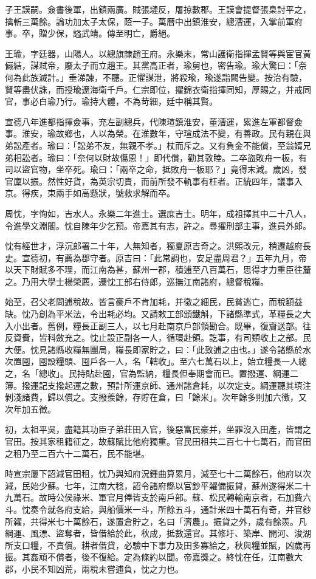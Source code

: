 \begin{pinyinscope}
子王謨嗣。僉書後軍，出鎮兩廣。賊張璉反，屠掠數郡。王謨會提督張臬討平之，擒斬三萬餘。論功加太子太保，蔭一子。萬曆中出鎮淮安，總漕運，入掌前軍府事。卒，贈少保，謚武靖。傳至明亡，爵絕。

王瑜，字廷器，山陽人。以總旗隸趙王府。永樂末，常山護衛指揮孟賢等與宦官黃儼結，謀弒帝，廢太子而立趙王。其黨高正者，瑜舅也，密告瑜。瑜大驚曰：「奈何為此族滅計。」垂涕諫，不聽。正懼謀泄，將殺瑜，瑜遂詣闕告變。按治有驗，賢等盡伏誅，而授瑜遼海衛千戶。仁宗即位，擢錦衣衛指揮同知，厚賜之，并戒同官，事必白瑜乃行。瑜持大體，不為苛細，廷中稱其賢。

宣德八年進都指揮僉事，充左副總兵，代陳瑄鎮淮安，董漕運，累進左軍都督僉事。淮安，瑜故鄉也，人以為榮。在淮數年，守瑄成法不變，有善政。民有親在與弟訟產者。瑜曰：「訟弟不友，無親不孝。」杖而斥之。又有負金不能償，至翁婿兄弟相訟者。瑜曰：「奈何以財故傷恩！」即代償，勸其敦睦。二卒盜敗舟一板，有司以盜官物，坐卒死。瑜曰：「兩卒之命，抵敗舟一板耶？」竟得末減。歲凶，發官廩以振。然性好貨，為英宗切責，而前所發不軌事有枉者。正統四年，議事入京。得疾，束兩手如高懸狀，號救求解而卒。

周忱，字恂如，吉水人。永樂二年進士。選庶吉士。明年，成祖擇其中二十八人，令進學文淵閣。忱自陳年少乞預。帝嘉其有志，許之。尋擢刑部主事，進員外郎。

忱有經世才，浮沉郎署二十年，人無知者，獨夏原吉奇之。洪熙改元，稍遷越府長史。宣德初，有薦為郡守者。原吉曰：「此常調也，安足盡周君？」五年九月，帝以天下財賦多不理，而江南為甚，蘇州一郡，積逋至八百萬石，思得才力重臣往釐之。乃用大學士楊榮薦，遷忱工部右侍郎，巡撫江南諸府，總督稅糧。

始至，召父老問逋稅故。皆言豪戶不肯加耗，并徵之細民，民貧逃亡，而稅額益缺。忱乃創為平米法，令出耗必均。又請敕工部頒鐵斛，下諸縣準式，革糧長之大入小出者。舊例，糧長正副三人，以七月赴南京戶部領勘合。既畢，復齎送部。往反資費，皆科斂充之。忱止設正副各一人，循環赴領。訖事，有司類收上之部。民大便。忱見諸縣收糧無團局，糧長即家貯之，曰：「此致逋之由也。」遂令諸縣於水次置囤，囤設糧頭、囤戶各一人，名「轄收」。至六七萬石以上，始立糧長一人總之，名「總收」。民持貼赴囤，官為監納，糧長但奉期會而已。置撥運、綱運二簿。撥運記支撥起運之數，預計所運京師、通州諸倉耗，以次定支。綱運聽其填注剝淺諸費，歸以償之。支撥羨餘，存貯在倉，曰「餘米」。次年餘多則加六徵，又次年加五徵。

初，太祖平吳，盡籍其功臣子弟莊田入官，後惡富民豪并，坐罪沒入田產，皆謂之官田。按其家租籍征之，故蘇賦比他府獨重。官民田租共二百七十七萬石，而官田之租乃至二百六十二萬石，民不能堪。

時宣宗屢下詔減官田租，忱乃與知府況鍾曲算累月，減至七十二萬餘石，他府以次減，民始少蘇。七年，江南大稔，詔令諸府縣以官鈔平糴備振貸，蘇州遂得米二十九萬石。故時公侯祿米、軍官月俸皆支於南戶部。蘇、松民轉輸南京者，石加費六斗。忱奏令就各府支給，與船價米一斗，所餘五斗，通計米四十萬石有奇，并官鈔所糴，共得米七十萬餘石，遂置倉貯之，名曰「濟農」。振貸之外，歲有餘羨。凡綱運、風漂、盜奪者，皆借給於此，秋成，抵數還官。其修圩、築岸、開河、浚湖所支口糧，不責償。耕者借貸，必驗中下事力及田多寡給之，秋與糧並賦，凶歲再振。其姦頑不償者，後不復給。定為條約以聞。帝嘉獎之。終忱在任，江南數大郡，小民不知凶荒，兩稅未嘗逋負，忱之力也。


\end{pinyinscope}
